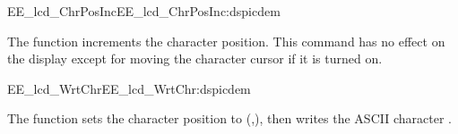 \begin{function_nopb2}{EE\_lcd\_ChrPosInc}{EE_lcd_ChrPosInc:dspicdem}
  
  \begin{fundescription}
    The function increments the character position. This command has
    no effect on the display except for moving the character cursor if
    it is turned on.
  \end{fundescription}
  
  
  
\end{function_nopb2}

\begin{function_nopb2}{EE\_lcd\_WrtChr}{EE_lcd_WrtChr:dspicdem}
  
  \begin{fundescription}
    The function sets the character position to
    (,), then writes the ASCII character
    .
  \end{fundescription}
  
  \begin{funparameters}
  \end{funparameters}
  
  
\end{function_nopb2}

